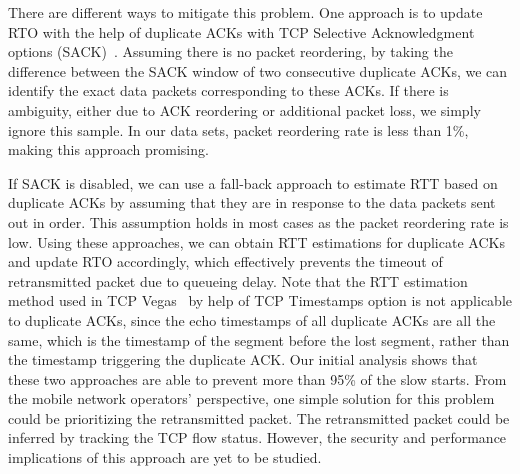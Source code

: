 There are different ways to mitigate this problem. One approach is to update RTO with the help of duplicate ACKs with TCP Selective Acknowledgment options (SACK)~\cite{rfc2018}. Assuming there is no packet reordering, by taking the difference between the SACK window of two consecutive duplicate ACKs, we can identify the exact data packets corresponding to these ACKs. If there is ambiguity, either due to ACK reordering or additional packet loss, we simply ignore this sample. In our data sets, packet reordering rate is less than 1\%, making this approach promising.

If SACK is disabled, we can use a fall-back approach to estimate RTT based on duplicate ACKs by assuming that they are in response to the data packets sent out in order. This assumption holds in most cases as the packet reordering rate is low. Using these approaches, we can obtain RTT estimations for duplicate ACKs and update RTO accordingly, which effectively prevents the timeout of retransmitted packet due to queueing delay. Note that the RTT estimation method used in TCP Vegas~\cite{tcp.vegas} by help of TCP Timestamps option is not applicable to duplicate ACKs, since the echo timestamps of all duplicate ACKs are all the same, which is the timestamp of the segment before the lost segment, rather than the timestamp triggering the duplicate ACK. Our initial analysis shows that these two approaches are able to prevent more than 95\% of the slow starts. From the mobile network operators' perspective, one simple solution for this problem could be prioritizing the retransmitted packet. The retransmitted packet could be inferred by tracking the TCP flow status. However, the security and performance implications of this approach are yet to be studied.


